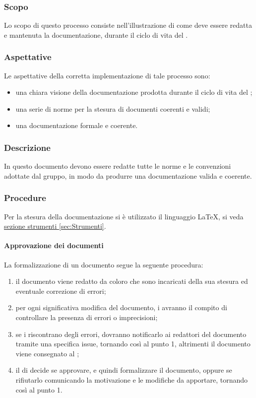 \subsubsection{Scopo}
Lo scopo di questo processo consiste nell'illustrazione di come deve essere redatta e mantenuta
la documentazione, durante il ciclo di vita del .
\subsubsection{Aspettative}
Le aspettative della corretta implementazione di tale processo sono:
\begin{itemize}
	\item una chiara visione della documentazione prodotta durante il ciclo di vita
del ;
	\item una serie di norme per la stesura di documenti coerenti e validi;
	\item una documentazione formale e coerente.
\end{itemize}
\subsubsection{Descrizione}
In questo documento devono essere redatte tutte le norme e le convenzioni adottate dal gruppo,
in modo da produrre una documentazione valida e coerente.
\subsubsection{Procedure}
Per la stesura della documentazione si è utilizzato il linguaggio \LaTeX, si veda \hyperref[sec:Strumenti]{sezione strumenti \ref*{sec:Strumenti}}.
 \paragraph{Approvazione dei documenti}
La formalizzazione di un documento segue la seguente procedura:
\begin{enumerate}
	\item il documento viene redatto da coloro che sono incaricati della sua stesura ed eventuale correzione di errori;
	\item per ogni significativa modifica del documento, i \VERP{} avranno il compito di controllare la presenza di errori o imprecisioni;
	\item se i \VERP{} riscontrano degli errori, dovranno notificarlo ai redattori del documento tramite una specifica issue, tornando così al punto 1, altrimenti il documento viene consegnato al \RESP ;
	\item il \RESP{} di  decide se approvare, e quindi formalizzare il documento, oppure se rifiutarlo comunicando la motivazione e le modifiche da apportare, tornando così al punto 1.
\end{enumerate}

